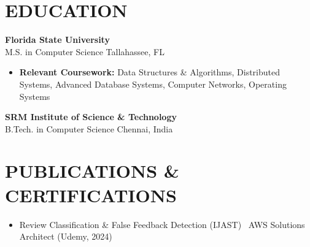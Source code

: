 \documentclass[letterpaper,10pt]{article}
\newcommand{\resumeItem}[1]{\item\small #1}
\newcommand{\resumeSubheading}[4]{
  \vspace{6pt}
  \noindent
  \textbf{#1} \hfill {\footnotesize #2} \\
  [-1pt]
  \noindent
  \small #3 \hfill {\small #4}
  \vspace{3pt}
}
\newcommand{\resumeItemsStart}{\vspace{-2pt}\begin{itemize}}
\newcommand{\resumeItemsEnd}{\end{itemize}\vspace{6pt}}
\begin{document}
\section{\textcolor{metablue}{EDUCATION}}
\vspace{-10pt}
\resumeSubheading
{Florida State University}{}
{M.S. in Computer Science}{Tallahassee, FL}
\resumeItemsStart
\resumeItem{\textbf{Relevant Coursework:} Data Structures \& Algorithms, Distributed Systems, Advanced Database Systems, Computer Networks, Operating Systems}
\resumeItemsEnd
\vspace{-5pt}
\resumeSubheading
{SRM Institute of Science \& Technology}{}
{B.Tech. in Computer Science}{Chennai, India}
\vspace{-10pt}

\section{\textcolor{metablue}{PUBLICATIONS \& CERTIFICATIONS}}
\vspace{-5pt}
\begin{itemize}
\resumeItem{Review Classification \& False Feedback Detection (IJAST) \textbar\ AWS Solutions Architect (Udemy, 2024)}
\end{itemize}
\end{document}
